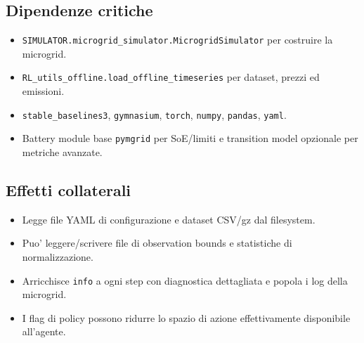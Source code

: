 \subsection*{Dipendenze critiche}
\begin{itemize}[leftmargin=1.2cm]
\item \texttt{SIMULATOR.microgrid\_simulator.MicrogridSimulator} per costruire la microgrid.
\item \texttt{RL\_utils\_offline.load\_offline\_timeseries} per dataset, prezzi ed emissioni.
\item \texttt{stable\_baselines3}, \texttt{gymnasium}, \texttt{torch}, \texttt{numpy}, \texttt{pandas}, \texttt{yaml}.
\item Battery module base \texttt{pymgrid} per SoE/limiti e transition model opzionale per metriche avanzate.
\end{itemize}

\subsection*{Effetti collaterali}
\begin{itemize}[leftmargin=1.2cm]
\item Legge file YAML di configurazione e dataset CSV/gz dal filesystem.
\item Puo' leggere/scrivere file di observation bounds e statistiche di normalizzazione.
\item Arricchisce \texttt{info} a ogni step con diagnostica dettagliata e popola i log della microgrid.
\item I flag di policy possono ridurre lo spazio di azione effettivamente disponibile all'agente.
\end{itemize}

